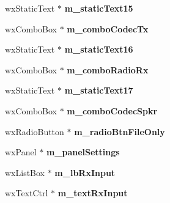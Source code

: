 \begin{DoxyCompactItemize}
\item 
\hypertarget{class_dlg_audio_adf762645da78b3948bc1fe8ba31b1444}{wx\-Static\-Text $\ast$ {\bfseries m\-\_\-static\-Text15}}\label{class_dlg_audio_adf762645da78b3948bc1fe8ba31b1444}

\item 
\hypertarget{class_dlg_audio_aeaf78c48df4b0314dc4dc06bfa2244b7}{wx\-Combo\-Box $\ast$ {\bfseries m\-\_\-combo\-Codec\-Tx}}\label{class_dlg_audio_aeaf78c48df4b0314dc4dc06bfa2244b7}

\item 
\hypertarget{class_dlg_audio_a90f47825bd359dfde13a0f2e6aa34e69}{wx\-Static\-Text $\ast$ {\bfseries m\-\_\-static\-Text16}}\label{class_dlg_audio_a90f47825bd359dfde13a0f2e6aa34e69}

\item 
\hypertarget{class_dlg_audio_aa2cf1a98f25e26545da3044b354ba9a6}{wx\-Combo\-Box $\ast$ {\bfseries m\-\_\-combo\-Radio\-Rx}}\label{class_dlg_audio_aa2cf1a98f25e26545da3044b354ba9a6}

\item 
\hypertarget{class_dlg_audio_aab6e9f04d01aff925f76195da96471fc}{wx\-Static\-Text $\ast$ {\bfseries m\-\_\-static\-Text17}}\label{class_dlg_audio_aab6e9f04d01aff925f76195da96471fc}

\item 
\hypertarget{class_dlg_audio_af35d36a3df31c77480d7714e08533d58}{wx\-Combo\-Box $\ast$ {\bfseries m\-\_\-combo\-Codec\-Spkr}}\label{class_dlg_audio_af35d36a3df31c77480d7714e08533d58}

\item 
\hypertarget{class_dlg_audio_abbbc7d86cca84f89c78c16b9b6d3b793}{wx\-Radio\-Button $\ast$ {\bfseries m\-\_\-radio\-Btn\-File\-Only}}\label{class_dlg_audio_abbbc7d86cca84f89c78c16b9b6d3b793}

\item 
\hypertarget{class_dlg_audio_acfc12b7c79d7b058f6702d13d5663f70}{wx\-Panel $\ast$ {\bfseries m\-\_\-panel\-Settings}}\label{class_dlg_audio_acfc12b7c79d7b058f6702d13d5663f70}

\item 
\hypertarget{class_dlg_audio_a0690c3ab64ff5a74b476250f5f5ad490}{wx\-List\-Box $\ast$ {\bfseries m\-\_\-lb\-Rx\-Input}}\label{class_dlg_audio_a0690c3ab64ff5a74b476250f5f5ad490}

\item 
\hypertarget{class_dlg_audio_a159d6689a03be5cd0f7fef25bba965fc}{wx\-Text\-Ctrl $\ast$ {\bfseries m\-\_\-text\-Rx\-Input}}\label{class_dlg_audio_a159d6689a03be5cd0f7fef25bba965fc}


\end{DoxyCompactItemize}
